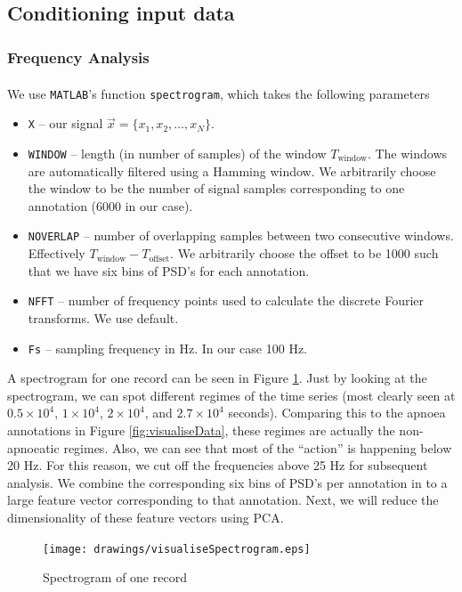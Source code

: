 \subsection{Conditioning input data}

\subsubsection{Frequency Analysis}
	We use \verb!MATLAB!\textsuperscript{\textregistered}'s function \verb|spectrogram|, which takes the following parameters
	\begin{itemize}
		\item \verb!X! -- our signal $\vec x = \{x_1, x_2, \dotsc, x_N\}$.
		\item \verb!WINDOW! -- length (in number of samples) of the window $T_\text{window}$. The windows are automatically filtered using a Hamming window. We arbitrarily choose the window to be the number of signal samples corresponding to one annotation (6000 in our case).
		\item \verb!NOVERLAP! -- number of overlapping samples between two consecutive windows. Effectively $T_\text{window} - T_\text{offset}$. We arbitrarily choose the offset to be 1000 such that we have six bins of PSD's for each annotation.
		\item \verb!NFFT! -- number of frequency points used to calculate the discrete Fourier transforms. We use default.
		\item \verb!Fs! -- sampling frequency in Hz. In our case 100 Hz.
	\end{itemize}
	A spectrogram for one record can be seen in Figure \ref{fig:visualiseSpectrogram}. Just by looking at the spectrogram, we can spot different regimes of the time series (most clearly seen at $0.5 \times 10^4$, $1 \times 10^4$, $2 \times 10^4$, and $2.7 \times 10^4$ seconds). Comparing this to the apnoea annotations in Figure \ref{fig:visualiseData}, these regimes are actually the non-apnoeatic regimes. Also, we can see that most of the ``action'' is happening below 20 Hz. For this reason, we cut off the frequencies above 25 Hz for subsequent analysis. We combine the corresponding six bins of PSD's per annotation in to a large feature vector corresponding to that annotation. Next, we will reduce the dimensionality of these feature vectors using PCA.

	\begin{figure}[ht!]
		\centering
			\texttt{[image: drawings/visualiseSpectrogram.eps]}
		\caption{Spectrogram of one record}
		\label{fig:visualiseSpectrogram}
	\end{figure}


